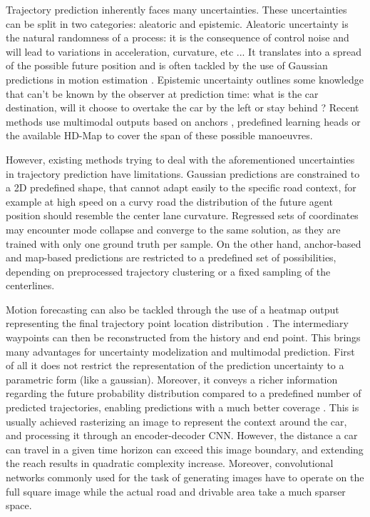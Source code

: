 \documentclass[letterpaper, 10 pt, conference]{ieeeconf}
\begin{document}
Trajectory prediction inherently faces many uncertainties. These uncertainties can be split in two categories: aleatoric and epistemic. Aleatoric uncertainty is the natural randomness of a process: it is the consequence of control noise and will lead to variations in acceleration, curvature, etc ... It translates into a spread of the possible future position and is often tackled by the use of Gaussian predictions in motion estimation \cite{deo2018multi, mercat2020multi}. Epistemic uncertainty outlines some knowledge that can't be known by the observer at prediction time: what is the car destination, will it choose to overtake the car by the left or stay behind ? Recent methods use multimodal outputs based on anchors \cite{chai2020multipath, phan2020covernet}, predefined learning heads \cite{cui2019multimodal} or the available HD-Map \cite{zhao2020tnt, zeng2021lanercnn, narayanan2021divide, kim2021lapred} to cover the span of these possible manoeuvres.
    
    However, existing methods trying to deal with the aforementioned uncertainties in trajectory prediction have limitations. Gaussian predictions are constrained to a 2D predefined shape, that cannot adapt easily to the specific road context, for example at high speed on a curvy road the distribution of the future agent position should resemble the center lane curvature. Regressed sets of coordinates may encounter mode collapse and converge to the same solution, as they are trained with only one ground truth per sample. On the other hand, anchor-based and map-based predictions are restricted to a predefined set of possibilities, depending on preprocessed trajectory clustering or a fixed sampling of the centerlines.
	
	Motion forecasting can also be tackled through the use of a heatmap output representing the final trajectory point location distribution \cite{gilles2021home, mangalam2020goals}. The intermediary waypoints can then be reconstructed  from the history and end point. This brings many advantages for uncertainty modelization and multimodal prediction. First of all it does not restrict the representation of the prediction uncertainty to a parametric form (like a gaussian). Moreover, it conveys a richer information regarding the future probability distribution compared to a predefined number of predicted trajectories, enabling predictions with a much better coverage . This is usually achieved rasterizing an image to represent the context around the car, and processing it through an encoder-decoder CNN. However, the distance a car can travel in a given time horizon can exceed this image boundary, and extending the reach results in quadratic complexity increase. Moreover, convolutional networks commonly used for the task of generating images have to operate on the full square image while the actual road and drivable area take a much sparser space.
\end{document}
